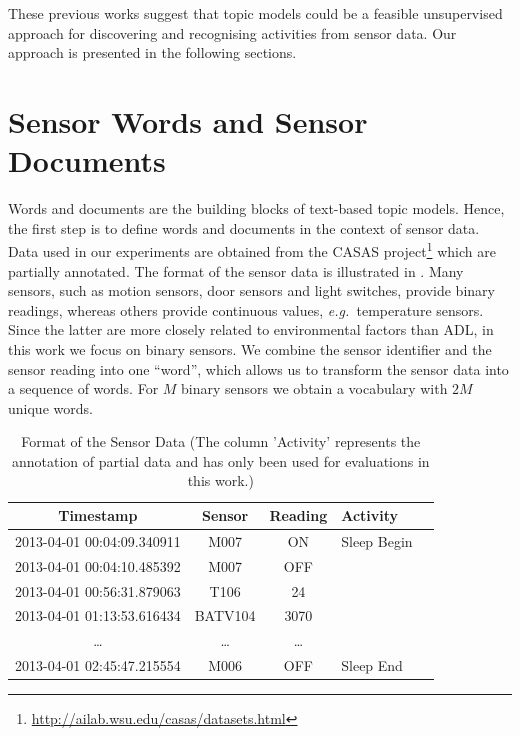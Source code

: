 \documentclass{article}
\newcommand{\eg}{{\em e.g.~\/}}
\begin{document}
These previous works suggest that topic models could be a feasible unsupervised approach for discovering and recognising activities from sensor data. Our approach is presented in the following sections.

%
\section{Sensor Words and Sensor Documents}
\label{sec:words_docs}
Words and documents are the building blocks of text-based topic models. Hence, the first step is to define words and documents in the context of sensor data.
Data used in our experiments are obtained from the CASAS project\footnote{\url{http://ailab.wsu.edu/casas/datasets.html}} which are partially annotated. The format of the sensor data is illustrated in . 
Many sensors, such as motion sensors, door sensors and light switches, provide binary readings, whereas others provide continuous values, \eg temperature sensors. Since the latter are more closely related to environmental factors than \ac{ADL}, in this work we focus on binary sensors. 
We combine the sensor identifier and the sensor reading into one ``word'', which allows us to transform the sensor data into a sequence of words. 
For $M$ binary sensors we obtain a vocabulary with $2M$ unique words. 

{%
\begin{table}[!t]
\centering
\scriptsize
\begin{tabular}{cccll}
\toprule
{\bf Timestamp}            & {\bf Sensor} & {\bf Reading} & {\bf Activity} \\ 
\midrule
2013-04-01 00:04:09.340911 & M007              & ON                   & Sleep Begin \\
2013-04-01 00:04:10.485392 & M007              & OFF                  & \\ 
2013-04-01 00:56:31.879063 & T106              & 24                   & \\ 
2013-04-01 01:13:53.616434 & BATV104           & 3070                 & \\
\ldots                     & \ldots            & \ldots               & \\
2013-04-01 02:45:47.215554 & M006              & OFF                  & Sleep End \\ 
\bottomrule
\end{tabular}
\caption{Format of the Sensor Data (The column 'Activity' represents the annotation of partial data and has only been used for evaluations in this work.)}
\label{tab:raw}
\end{table}
}
\end{document}
